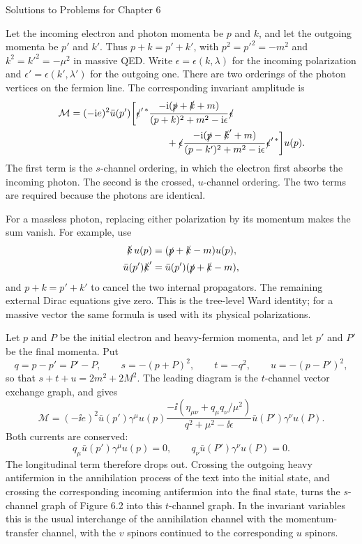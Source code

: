 \begin{bankssolutions}{Solutions to Problems for Chapter 6}

Let the incoming electron and photon momenta be $p$ and $k$, and let the
outgoing momenta be $p'$ and $k'$. Thus
$p+k=p'+k'$, with $p^2=p'^2=-m^2$ and $k^2=k'^2=-\mu^2$ in massive QED.
Write $\epsilon=\epsilon(k,\lambda)$ for the incoming polarization and
$\epsilon'=\epsilon(k',\lambda')$ for the outgoing one.  There are two
orderings of the photon vertices on the fermion line.  The corresponding
invariant amplitude is
\begin{align*}
 \mathcal M={}&(-\ii e)^2\bar u(p')\biggl[
 \slashed{\epsilon}'^{\,*}
 \frac{-\ii(\slashed p+\slashed k+m)}{(p+k)^2+m^2-\ii\epsilon}
 \slashed{\epsilon}\\
 &\hspace{3.0cm}+
 \slashed{\epsilon}
 \frac{-\ii(\slashed p-\slashed k'+m)}{(p-k')^2+m^2-\ii\epsilon}
 \slashed{\epsilon}'^{\,*}\biggr]u(p).
\end{align*}
The first term is the $s$-channel ordering, in which the electron first
absorbs the incoming photon.  The second is the crossed, $u$-channel
ordering.  The two terms are required because the photons are identical.

For a massless photon, replacing either polarization by its momentum makes
the sum vanish.  For example, use
\begin{align*}
 \slashed k\,u(p)&=(\slashed p+\slashed k-m)u(p),\\
 \bar u(p')\slashed k'&=\bar u(p')(\slashed p+\slashed k-m),
\end{align*}
and $p+k=p'+k'$ to cancel the two internal propagators.  The remaining
external Dirac equations give zero.  This is the tree-level Ward identity;
for a massive vector the same formula is used with its physical
polarizations.

Let $p$ and $P$ be the initial electron and heavy-fermion momenta, and let
$p'$ and $P'$ be the final momenta.  Put
\[
 q=p-p'=P'-P,
 \qquad s=-(p+P)^2,\qquad t=-q^2,\qquad u=-(p-P')^2,
\]
so that $s+t+u=2m^2+2M^2$.  The leading diagram is the $t$-channel vector
exchange graph, and gives
\begin{equation*}
 \mathcal M=(-\ii e)^2\bar u(p')\gamma^\mu u(p)
 \frac{-\ii(\eta_{\mu\nu}+q_\mu q_\nu/\mu^2)}
 {q^2+\mu^2-\ii\epsilon}
 \bar u(P')\gamma^\nu u(P).
\end{equation*}
Both currents are conserved:
\[
 q_\mu\bar u(p')\gamma^\mu u(p)=0,
 \qquad
 q_\nu\bar u(P')\gamma^\nu u(P)=0.
\]
The longitudinal term therefore drops out.  Crossing the outgoing heavy
antifermion in the annihilation process of the text into the initial state,
and crossing the corresponding incoming antifermion into the final state,
turns the $s$-channel graph of Figure 6.2 into this $t$-channel graph.  In
the invariant variables this is the usual interchange of the annihilation
channel with the momentum-transfer channel, with the $v$ spinors continued
to the corresponding $u$ spinors.


\end{bankssolutions}
